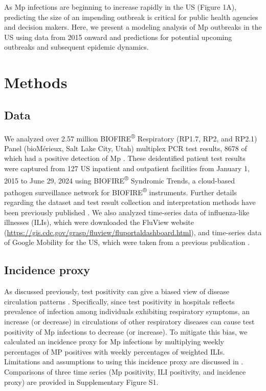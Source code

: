 \documentclass[12pt]{article}
\begin{document}
As Mp infections are beginning to increase rapidly in the US (Figure 1A), predicting the size of an impending outbreak is critical for public health agencies and decision makers.
Here, we present a modeling analysis of Mp outbreaks in the US using data from 2015 onward and predictions for potential upcoming outbreaks and subsequent epidemic dynamics.

\section{Methods}

\subsection{Data}

We analyzed over 2.57 million BIOFIRE\textsuperscript{®} Respiratory (RP1.7, RP2, and RP2.1) Panel (bioMérieux, Salt Lake City, Utah) multiplex PCR test results, 8678 of which had a positive detection of Mp \citep{poritz2011filmarray,leber2018multicenter,creager2020clinical}. 
These deidentified patient test results were captured from 127 US inpatient and outpatient facilities from January 1, 2015 to June 29, 2024 using BIOFIRE\textsuperscript{®} Syndromic Trends, a cloud-based pathogen surveillance network for BIOFIRE\textsuperscript{®} instruments. Further details regarding the dataset and test result collection and interpretation methods have been previously published \citep{meyers2018automated}.
We also analyzed time-series data of influenza-like illnesses (ILIs), which were downloaded the FluView website (\url{https://gis.cdc.gov/grasp/fluview/fluportaldashboard.html}), and time-series data of Google Mobility for the US, which were taken from a previous publication \citep{park2024predicting}.

\subsection{Incidence proxy}

As discussed previously, test positivity can give a biased view of disease circulation patterns \citep{goldstein2011predicting,kissler2020projecting,park2024predicting}. 
Specifically, since test positivity in hospitals reflects prevalence of infection among individuals exhibiting respiratory symptoms, an increase (or decrease) in circulations of other respiratory diseases can cause test positivity of Mp infections to decrease (or increase).
To mitigate this bias, we calculated an incidence proxy for Mp infections by multiplying weekly percentages of MP positives with weekly percentages of weighted ILIs.
Limitations and assumptions to using this incidence proxy are discussed in \cite{goldstein2011predicting}.
Comparisons of three time series (Mp positivity, ILI positivity, and incidence proxy) are provided in Supplementary Figure S1. 
\end{document}
